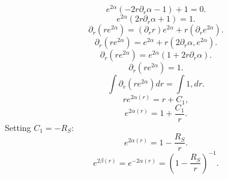 \documentclass[11pt, a4paper]{report}
\begin{document}
\begin{equation}
e^{2\alpha} \left( -2r\partial_r\alpha - 1 \right) + 1 = 0.
\end{equation}
\begin{equation}
e^{2\alpha} \left( 2r\partial_r\alpha + 1 \right) = 1.
\end{equation}
\begin{equation}
\partial_r \left( r e^{2\alpha} \right) = \left( \partial_r r \right) e^{2\alpha} + r \left( \partial_r e^{2\alpha} \right).
\end{equation}
\begin{equation}
\partial_r \left( r e^{2\alpha} \right) = e^{2\alpha} + r \left( 2\partial_r\alpha , e^{2\alpha} \right).
\end{equation}
\begin{equation}
\partial_r \left( r e^{2\alpha} \right) = e^{2\alpha} \left( 1 + 2r\partial_r\alpha \right).
\end{equation}
\begin{equation}
\partial_r \left( r e^{2\alpha} \right) = 1.
\end{equation}
\begin{equation}
\int \partial_r \left( r e^{2\alpha} \right) dr = \int 1 , dr.
\end{equation}
\begin{equation}
r e^{2\alpha(r)} = r + C_1,
\end{equation}
\begin{equation}
e^{2\alpha(r)} = 1 + \frac{C_1}{r}.
\end{equation}
Setting $C_1 = -R_S$:
\begin{equation}
e^{2\alpha(r)} = 1 - \frac{R_S}{r}.
\end{equation}
\begin{equation}
e^{2\beta(r)} = e^{-2\alpha(r)} = \left( 1 - \frac{R_S}{r} \right)^{-1}.
\end{equation}
\end{document}

